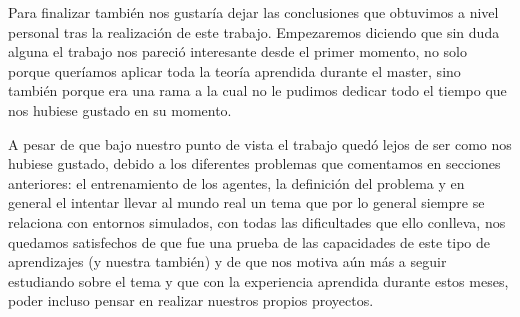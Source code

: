 Para finalizar también nos gustaría dejar las conclusiones que obtuvimos a nivel personal tras la realización de este trabajo. Empezaremos diciendo que sin duda alguna el trabajo nos pareció interesante desde el primer momento, no solo porque queríamos aplicar toda la teoría aprendida durante el master, sino también porque era una rama a la cual no le pudimos dedicar todo el tiempo que nos hubiese gustado en su momento. 
\medskip

A pesar de que bajo nuestro punto de vista el trabajo quedó lejos de ser como nos hubiese gustado, debido a los diferentes problemas que comentamos en secciones anteriores: el entrenamiento de los agentes, la definición del problema y en general el intentar llevar al mundo real un tema que por lo general siempre se relaciona con entornos simulados, con todas las dificultades que ello conlleva, nos quedamos satisfechos de que fue una prueba de las capacidades de este tipo de aprendizajes (y nuestra también) y de que nos motiva aún más a seguir estudiando sobre el tema y que con la experiencia aprendida durante estos meses, poder incluso pensar en realizar nuestros propios proyectos. 
